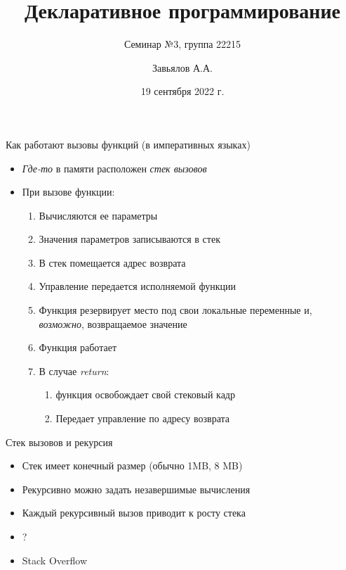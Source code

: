 \documentclass{beamer}
\title{Декларативное программирование}
\subtitle{Семинар №3, группа 22215}
\author{Завьялов А.А.}
\date{19 сентября 2022 г.}
\institute{Кафедра систем информатики ФИТ НГУ}
\begin{document}
  \maketitle
  \addtocounter{framenumber}{1}
  \begin{frame}{Как работают вызовы функций (в императивных языках)}
    \begin{itemize}
        \item \textit{Где-то} в памяти расположен \textit{стек вызовов}
        \item При вызове функции: \begin{enumerate}
            \item Вычисляются ее параметры
            \item Значения параметров записываются в стек
            \item В стек помещается адрес возврата
            \item Управление передается исполняемой функции
            \item Функция резервирует место под свои локальные переменные и, \textit{возможно}, возвращаемое значение
            \item Функция работает
            \item В случае \textit{return}:\begin{enumerate}
                \item функция освобождает свой стековый кадр
                \item Передает управление по адресу возврата
            \end{enumerate} 
        \end{enumerate}
    \end{itemize}
  \end{frame}
  \begin{frame}{Стек вызовов и рекурсия}
      \begin{itemize}
          \item Стек имеет конечный размер (обычно 1MB, 8 MB)
          \item Рекурсивно можно задать незавершимые вычисления
          \item Каждый рекурсивный вызов приводит к росту стека
          \item ?
          \item \pause\alert{Stack Overflow}
      \end{itemize}
  \end{frame}
\end{document}
